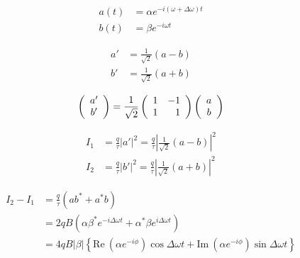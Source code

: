 \documentclass{book}
\begin{document}
\begin{equation}
\begin{aligned}
	a(t) &= \alpha e^{-i(\omega + \Delta \omega)t}\\
  	b(t) &= \beta e^{-i\omega t}
\end{aligned}\label{eq:complex_amplitude}
\end{equation}

\begin{equation}
\begin{aligned}
  a' &= \frac{1}{\sqrt 2}(a - b)\\
  b' &= \frac{1}{\sqrt 2}(a + b)
\end{aligned}\label{eq:BS_complex_amplitude}
\end{equation}

\begin{equation}
  \left( \begin{array}{c}
  	a' \\ b'
  \end{array}
  \right) =
  \frac{1}{\sqrt 2}\left( \begin{array}{r r} 
  	1 & -1 \\ 1 & 1
 \end{array}
	\right)
	\left( \begin{array}{c}
		a \\ b
	\end{array} \right)
	\label{eq:beamsplitter_matrix}
\end{equation}

\begin{equation}
\begin{aligned}
  I_1 &= \frac q \tau |a'|^2 = \frac{q}{\tau}\left|\frac{1}{\sqrt 2} (a - b)\right|^2\\
  I_2 &= \frac q \tau |b'|^2 = \frac{q}{\tau}\left|\frac{1}{\sqrt 2} (a + b)\right|^2
\end{aligned}
\end{equation}

\begin{equation}
\begin{aligned}
  I_2 - I_1 &= \frac{q}{\tau}(ab^* + a^* b)\\
  &= 2qB(\alpha \beta^* e^{-i\Delta\omega t} + \alpha^* \beta e^{i\Delta\omega t})\\
  &= 4qB|\beta|\left\{\mathrm{Re} \  (\alpha e^{-i\phi}) \cos \Delta \omega t + \mathrm{Im} \ (\alpha e^{-i\phi}) \sin \Delta \omega t\right\}
\end{aligned}\label{eq:output_of_balanced_detector}
\end{equation}
\end{document}
